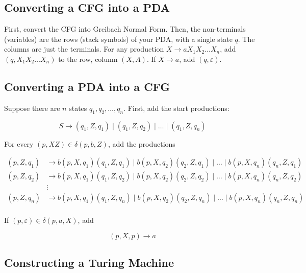\subsection{Converting a CFG into a PDA}
First, convert the CFG into Greibach Normal Form. Then, the non-terminals (variables) are the rows (stack symbols) of your PDA, with a single state \(q\). The columns are just the terminals. For any production \(X\to aX_1 X_2\hdots X_n\), add \((q, X_1 X_2\hdots X_n)\) to the row, column \((X, A)\). If \(X\to a\), add \((q, \varepsilon)\). 

\subsection{Converting a PDA into a CFG}
Suppose there are \(n\) states \(q_1, q_2, \hdots, q_n\). First, add the start productions:

\[S\to (q_1, Z, q_1)\mid(q_1, Z, q_2)\mid\hdots\mid(q_1, Z, q_n)\]

For every \((p, XZ) \in \delta(p, b, Z)\), add the productions

\begin{align*}
    (p, Z, q_1) &\to b(p, X, q_1)(q_1, Z, q_1)\mid b(p, X, q_2)(q_2, Z, q_1)\mid\hdots\mid b(p, X, q_n)(q_n, Z, q_1)\\
    (p, Z, q_2) &\to b(p, X, q_1)(q_1, Z, q_2)\mid b(p, X, q_2)(q_2, Z, q_2)\mid\hdots\mid b(p, X, q_n)(q_n, Z, q_2)\\
                &\vdots\\
    (p, Z, q_n) &\to b(p, X, q_1)(q_1, Z, q_n)\mid b(p, X, q_2)(q_2, Z, q_n)\mid\hdots\mid b(p, X, q_n)(q_n, Z, q_n)\\    
\end{align*}

If \((p, \varepsilon)\in \delta(p, a, X)\), add 

\[(p, X, p)\to a\]

\subsection{Constructing a Turing Machine}
